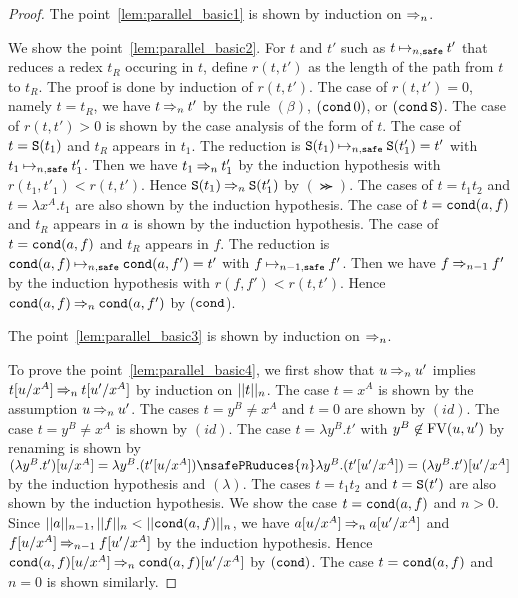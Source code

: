 \begin{proof}
  The point~\ref{lem:parallel_basic1} is shown by induction on $\nsafePReduces{n}$.
  
  We show the point~\ref{lem:parallel_basic2}.
  For $t$ and $t'$ such as $t\nsafeReduces{n} t'$
  that reduces a redex $t_R$ occuring in $t$, 
  define $r(t,t')$ as the length of the path from $t$ to $t_R$.
  The proof is done by induction of $r(t,t')$.
  The case of $r(t,t') = 0$, namely $t = t_R$,
  we have $t \nsafePReduces{n} t'$ by the rule $(\beta)$, $(\cond\,0)$,
  or $(\cond\,\Succ)$. 
  The case of $r(t,t') > 0$ is shown by the case analysis of the form of $t$.
  The case of $t=\Suc{t_1}$ and $t_R$ appears in $t_1$.
  The reduction is $\Suc{t_1} \nsafeReduces{n} \Suc{t'_1} = t'$ with $t_1 \nsafeReduces{n} t'_1$. 
  Then we have $t_1 \nsafePReduces{n} t'_1$ by the induction hypothesis with $r(t_1,t'_1) < r(t,t')$.
  Hence $\Suc{t_1} \nsafePReduces{n} \Suc{t'_1}$ by $(\Succ)$. 
  The cases of $t=t_1t_2$ and $t=\lambda x^A.t_1$ are also shown by the induction hypothesis. 
  The case of $t=\Cond{a}{f}$ and $t_R$ appears in $a$ is shown by the induction hypothesis.
  The case of $t=\Cond{a}{f}$ and $t_R$ appears in $f$.
  The reduction is $\Cond{a}{f} \nsafeReduces{n} \Cond{a}{f'} = t'$ with $f \nsafeReduces{n-1} f'$. 
  Then we have $f \nsafePReduces{n-1} f'$ by the induction hypothesis with $r(f,f') < r(t,t')$.
  Hence $\Cond{a}{f} \nsafePReduces{n} \Cond{a}{f'}$ by ($\cond$).

  The point~\ref{lem:parallel_basic3} is shown by induction on $\nsafePReduces{n}$. 

  To prove the point~\ref{lem:parallel_basic4}, we first show that
  $u \nsafePReduces{n} u'$ implies $t[u/x^A] \nsafePReduces{n} t[u'/x^A]$ by induction on $\Lv{n}{t}$.
  The case $t=x^A$ is shown by the assumption $u \nsafePReduces{n} u'$.
  The cases $t=y^B\neq x^A$ and $t=0$ are shown by $(id)$. 
  The case $t=y^B\neq x^A$ is shown by $(id)$.   
  The case $t=\lambda y^B.t'$ with $y^B\not\in\FV(u,u')$ by renaming is shown by
  $(\lambda y^B.t')[u/x^A] = \lambda y^B.(t'[u/x^A]) \nsafePRuduces{n} \lambda y^B.(t'[u'/x^A]) = (\lambda y^B.t')[u'/x^A]$ by the induction hypothesis and $(\lambda)$.
  The cases $t=t_1t_2$ and $t=\Suc{t'}$ are also shown by the induction hypothesis.
  We show the case $t=\Cond{a}{f}$ and $n>0$. 
  Since $\Lv{n-1}{a}, \Lv{n}{f} < \Lv{n}{\Cond{a}{f}}$, 
  we have $a[u/x^A] \nsafePReduces{n} a[u'/x^A]$ and $f[u/x^A] \nsafePReduces{n-1} f[u'/x^A]$
  by the induction hypothesis. Hence $\Cond{a}{f}[u/x^A] \nsafePReduces{n} \Cond{a}{f}[u'/x^A]$ by $(\cond)$. 
  The case $t=\Cond{a}{f}$ and $n=0$ is shown similarly. 


\end{proof}
